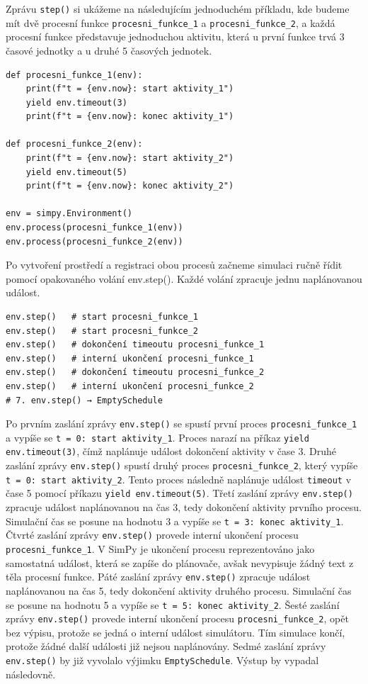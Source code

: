 \documentclass[
  program=itp,
  biblatex,
  figures=false,
  glossaries,
  index
]{kidiplom}
\begin{document}
Zprávu  \texttt{step()} si ukážeme na následujícím jednoduchém příkladu, kde budeme mít dvě procesní funkce \texttt{procesni\_funkce\_1} a \texttt{procesni\_funkce\_2}, a každá procesní funkce představuje jednoduchou aktivitu, která u první funkce trvá 3 časové jednotky a u druhé 5 časových jednotek.

 \begin{verbatim} 
def procesni_funkce_1(env):
    print(f"t = {env.now}: start aktivity_1")
    yield env.timeout(3)
    print(f"t = {env.now}: konec aktivity_1")

def procesni_funkce_2(env):
    print(f"t = {env.now}: start aktivity_2")
    yield env.timeout(5)
    print(f"t = {env.now}: konec aktivity_2")

env = simpy.Environment()
env.process(procesni_funkce_1(env))
env.process(procesni_funkce_2(env))

\end{verbatim}

\noindent Po vytvoření prostředí a registraci obou procesů začneme simulaci ručně řídit pomocí opakovaného volání env.step(). Každé volání zpracuje jednu naplánovanou událost.

 \begin{verbatim} 
env.step()   # start procesni_funkce_1
env.step()   # start procesni_funkce_2
env.step()   # dokončení timeoutu procesni_funkce_1
env.step()   # interní ukončení procesni_funkce_1
env.step()   # dokončení timeoutu procesni_funkce_2
env.step()   # interní ukončení procesni_funkce_2
# 7. env.step() → EmptySchedule
\end{verbatim}

\noindent Po prvním zaslání zprávy \texttt{env.step()} se spustí první proces \texttt{procesni\_funkce\_1} a vypíše se \texttt{t = 0: start aktivity\_1}. Proces narazí na příkaz \texttt{yield env.timeout(3)}, čímž naplánuje událost dokončení aktivity v čase 3. Druhé zaslání zprávy \texttt{env.step()} spustí druhý proces \texttt{procesni\_funkce\_2}, který vypíše \texttt{t = 0: start aktivity\_2}. Tento proces následně naplánuje událost \texttt{timeout} v čase 5 pomocí příkazu \texttt{yield env.timeout(5)}. Třetí zaslání zprávy \texttt{env.step()} zpracuje událost naplánovanou na čas 3, tedy dokončení aktivity prvního procesu. Simulační čas se posune na hodnotu 3 a vypíše se \texttt{t = 3: konec aktivity\_1}. Čtvrté zaslání zprávy \texttt{env.step()} provede interní ukončení procesu \texttt{procesni\_funkce\_1}. V SimPy je ukončení procesu reprezentováno jako samostatná událost, která se zapíše do plánovače, avšak nevypisuje žádný text z těla procesní funkce. Páté zaslání zprávy \texttt{env.step()} zpracuje událost naplánovanou na čas 5, tedy dokončení aktivity druhého procesu. Simulační čas se posune na hodnotu 5 a vypíše se \texttt{t = 5: konec aktivity\_2}. Šesté zaslání zprávy \texttt{env.step()} provede interní ukončení procesu \texttt{procesni\_funkce\_2}, opět bez výpisu, protože se jedná o interní událost simulátoru. Tím simulace končí, protože žádné další události již nejsou naplánovány. Sedmé zaslání zprávy \texttt{env.step()} by již vyvolalo výjimku \texttt{EmptySchedule}. Výstup by vypadal následovně.
\end{document}
